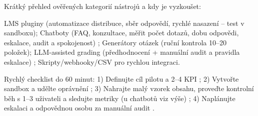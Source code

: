 Krátký přehled ověřených kategorií nástrojů a kdy je vyzkoušet:

LMS pluginy (automatizace distribuce, sběr odpovědí, rychlé nasazení – test v sandboxu); Chatboty (FAQ, konzultace, měřit počet dotazů, dobu odpovědi, eskalace, audit a spokojenost) \cite{2-5}; Generátory otázek (ruční kontrola 10–20 položek); LLM-assisted grading (předhodnocení + manuální audit a pravidla eskalace) \cite{2-6}; Skripty/webhooky/CSV pro rychlou integraci.

Rychlý checklist do 60 minut: 1) Definujte cíl pilotu a 2–4 KPI \cite{2-6}; 2) Vytvořte sandbox a udělte oprávnění \cite{2-6}; 3) Nahrajte malý vzorek obsahu, proveďte kontrolní běh s 1–3 uživateli a sledujte metriky (u chatbotů viz výše) \cite{2-5}; 4) Naplánujte eskalaci a odpovědnou osobu za manuální audit \cite{2-6}.